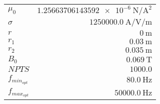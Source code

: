 
{%
    \begin{center}
    \label{tab:fitparams:st:freq:exact:opt}
    \begin{tabular}{lr}
    \toprule
        $\mu_0$ & $\SI{1.25663706143592e-6}{\newton\per\ampere\squared}$\\
        $\sigma$ & $\SI{1250000.0}{\ampere\per\volt\per\meter}$\\
        $r$ & $\SI{0}{\meter}$\\
        $r_1$ & $\SI{0.03}{\meter}$\\
        $r_2$ & $\SI{0.035}{\meter}$\\
        $B_0$ & $\SI{0.069}{\tesla}$\\
        $NPTS$ & $\num{1000.0}$\\
        $f_{min_{opt}}$ & $\SI{80.0}{\hertz}$\\
        $f_{max_{opt}}$ & $\SI{50000.0}{\hertz}$\\

    \bottomrule
    \end{tabular}
    \end{center}
}

